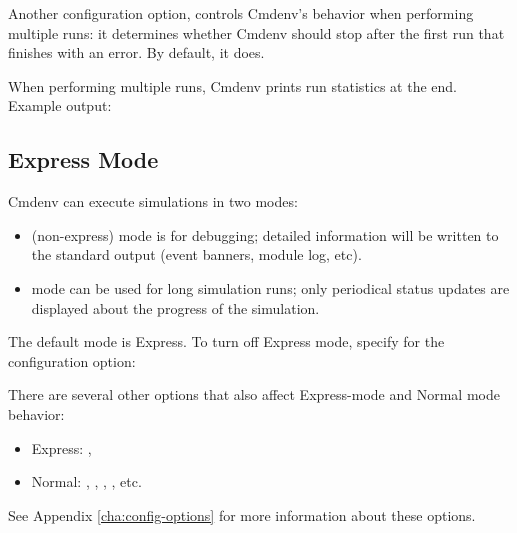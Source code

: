 Another configuration option,  controls
Cmdenv's behavior when performing multiple runs: it determines
whether Cmdenv should stop after the first run that finishes with an
error. By default, it does.

When performing multiple runs, Cmdenv prints run statistics at the end. Example
output:



\subsection{Express Mode}
\label{sec:run-sim:cmdenv:express-mode}

Cmdenv can execute simulations in two modes:

\begin{itemize}
    \item {} (non-express) mode is for debugging; detailed information
        will be written to the standard output (event banners, module log,
        etc).
    \item {} mode can be used for long simulation runs; only
        periodical status updates are displayed about the progress of the
        simulation.
\end{itemize}

The default mode is Express. To turn off Express mode, specify  for
the  configuration option:
 

There are several other options that also affect Express-mode and Normal
mode behavior:

\begin{itemize}
  \item Express: , 
  \item Normal: , ,
        , , etc.
\end{itemize}

See Appendix \ref{cha:config-options} for more information about these options.

